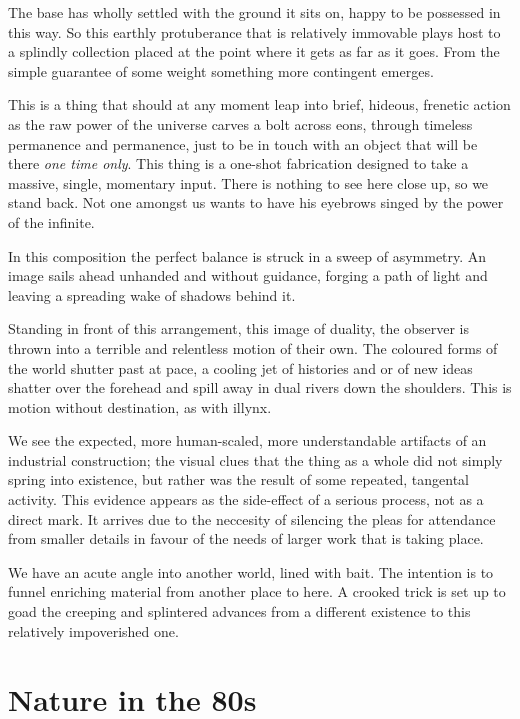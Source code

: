 \documentclass{book}
\begin{document}
The base has wholly settled with the ground it sits on, happy to be possessed
in this way. So this earthly protuberance that is relatively immovable plays
host to a splindly collection placed at the point where it gets as far as it
goes. From the simple guarantee of some weight something more contingent
emerges.

This is a thing that should at any moment leap into brief, hideous, frenetic
action as the raw power of the universe carves a bolt across eons, through
timeless permanence and permanence, just to be in touch with an object that
will be there \emph{one time only}.  This thing is a one-shot fabrication
designed to take a massive, single, momentary input. There is nothing to see
here close up, so we stand back. Not one amongst us wants to have his eyebrows
singed by the power of the infinite.

In this composition the perfect balance is struck in a sweep of asymmetry. An
image sails ahead unhanded and without guidance, forging a path of light and
leaving a spreading wake of shadows behind it.

Standing in front of this arrangement, this image of duality, the observer is
thrown into a terrible and relentless motion of their own. The coloured forms
of the world shutter past at pace, a cooling jet of histories and or of new
ideas shatter over the forehead and spill away in dual rivers down the
shoulders. This is motion without destination, as with illynx.

We see the expected, more human-scaled, more understandable artifacts of an
industrial construction; the visual clues that the thing as a whole did not
simply spring into existence, but rather was the result of some repeated,
tangental activity. This evidence appears as the side-effect of a serious
process, not as a direct mark. It arrives due to the neccesity of silencing the
pleas for attendance from smaller details in favour of the needs of larger work
that is taking place.

We have an acute angle into another world, lined with bait. The intention is to
funnel enriching material from another place to here. A crooked trick is set up
to goad the creeping and splintered advances from a different existence to this
relatively impoverished one. 

\chapter{Nature in the 80s}
\end{document}
